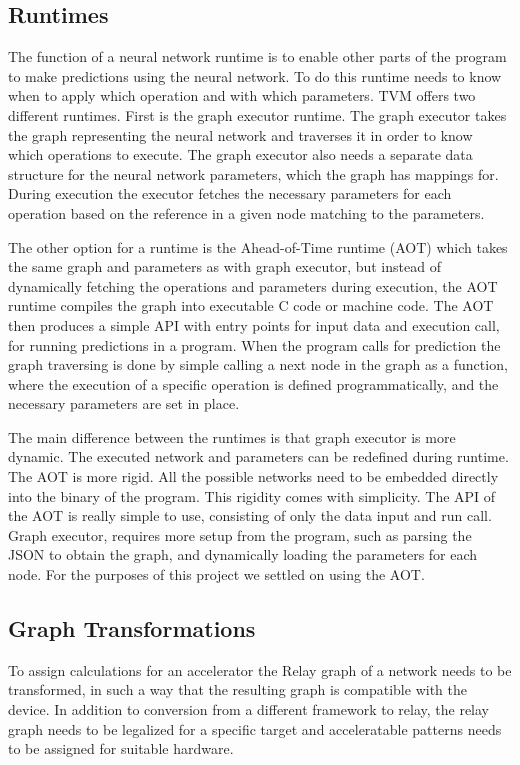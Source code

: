 \documentclass[12pt,a4paper,english
]{tunithesis}
\begin{document}
\subsection{Runtimes}
The function of a neural network runtime is to enable other parts of the program to make predictions using the neural network. To do this runtime needs to know when to apply which operation and with which parameters. TVM offers two different runtimes. First is the graph executor runtime. The graph executor takes the graph representing the neural network and traverses it in order to know which operations to execute. The graph executor also needs a separate data structure for the neural network parameters, which the graph has mappings for. During execution the executor fetches the necessary parameters for each operation based on the reference in a given node matching to the parameters.

The other option for a runtime is the Ahead-of-Time runtime (AOT) which takes the same graph and parameters as with graph executor, but instead of dynamically fetching the operations and parameters during execution, the AOT runtime compiles the graph into executable C code or machine code. The AOT then produces a simple API with entry points for input data and execution call, for running predictions in a program. When the program calls for prediction the graph traversing is done by simple calling a next node in the graph as a function, where the execution of a specific operation is defined programmatically, and the necessary parameters are set in place.

The main difference between the runtimes is that graph executor is more dynamic. The executed network and parameters can be redefined during runtime. The AOT is more rigid. All the possible networks need to be embedded directly into the binary of the program. This rigidity comes with simplicity. The API of the AOT is really simple to use, consisting of only the data input and run call. Graph executor, requires more setup from the program, such as parsing the JSON to obtain the graph, and dynamically loading the parameters for each node. For the purposes of this project we settled on using the AOT.

\subsection{Graph Transformations}
To assign calculations for an accelerator the Relay graph of a network needs to be transformed, in such a way that the resulting graph is compatible with the device. In addition to conversion from a different framework to relay, the relay graph needs to be legalized for a specific target and acceleratable patterns needs to be assigned for suitable hardware.
\end{document}
